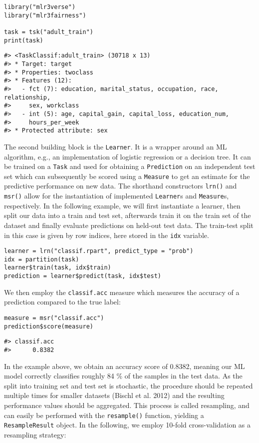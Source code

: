 \begin{verbatim}
library("mlr3verse")
library("mlr3fairness")

task = tsk("adult_train")
print(task)
\end{verbatim}

\begin{verbatim}
#> <TaskClassif:adult_train> (30718 x 13)
#> * Target: target
#> * Properties: twoclass
#> * Features (12):
#>   - fct (7): education, marital_status, occupation, race, relationship,
#>     sex, workclass
#>   - int (5): age, capital_gain, capital_loss, education_num,
#>     hours_per_week
#> * Protected attribute: sex
\end{verbatim}

The second building block is the \texttt{Learner}.
It is a wrapper around an ML algorithm, e.g., an implementation of logistic regression or a decision tree.
It can be trained on a \texttt{Task} and used for obtaining a \texttt{Prediction} on an independent test set which can subsequently be scored using a \texttt{Measure} to get an estimate for the predictive performance on new data.
The shorthand constructors \texttt{lrn()} and \texttt{msr()} allow for the instantiation of implemented \texttt{Learner}s and \texttt{Measure}s, respectively.
In the following example, we will first instantiate a learner, then split our data into a train and test set, afterwards train it on the train set of the dataset and finally evaluate predictions on held-out test data.
The train-test split in this case is given by row indices, here stored in the \texttt{idx} variable.

\begin{verbatim}
learner = lrn("classif.rpart", predict_type = "prob")
idx = partition(task)
learner$train(task, idx$train)
prediction = learner$predict(task, idx$test)
\end{verbatim}

We then employ the \texttt{classif.acc} measure which measures the accuracy of a prediction compared to the true label:

\begin{verbatim}
measure = msr("classif.acc")
prediction$score(measure)
\end{verbatim}

\begin{verbatim}
#> classif.acc 
#>      0.8382
\end{verbatim}

In the example above, we obtain an accuracy score of 0.8382, meaning our ML model correctly classifies roughly 84 \% of the samples in the test data.
As the split into training set and test set is stochastic, the procedure should be repeated multiple times for smaller datasets (Bischl et al. 2012) and the resulting performance values should be aggregated.
This process is called resampling, and can easily be performed with the \texttt{resample()} function, yielding a \texttt{ResampleResult} object.
In the following, we employ 10-fold cross-validation as a resampling strategy:

